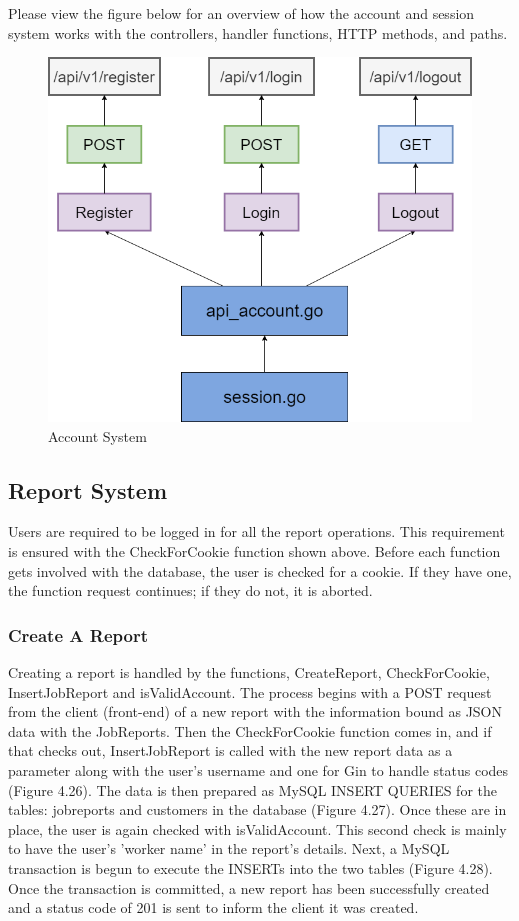 Please view the figure below for an overview of how the account and session system works with the controllers, handler functions, HTTP methods, and paths.
\begin{figure}[H]
    \caption{Account System}
    \label{image:accountSystem}
    \centering
    \includegraphics[width=1.0\textwidth]{images/horton/account_system/account_system.png}
\end{figure}

\subsection{Report System}
Users are required to be logged in for all the report operations. This requirement is ensured with the CheckForCookie function shown above. Before each function gets involved with the database, the user is checked for a cookie. If they have one, the function request continues; if they do not, it is aborted.

\subsubsection{Create A Report}
Creating a report is handled by the functions, CreateReport, CheckForCookie, InsertJobReport
and isValidAccount. The process begins with a POST request from the client (front-end) of a new report with the information bound as JSON data with the JobReports. Then the CheckForCookie function comes in, and if that checks out, InsertJobReport is called with the new report data as a parameter along with the user's username and one for Gin to handle status codes (Figure 4.26). The data is then prepared as MySQL INSERT QUERIES for the tables: jobreports and customers in the database (Figure 4.27). Once these are in place, the user is again checked with isValidAccount. This second check is mainly to have the user's 'worker name' in the report's details. Next, a MySQL transaction is begun to execute the INSERTs into the two tables (Figure 4.28). Once the transaction is committed, a new report has been successfully created and a status code of 201 is sent to inform the client it was created. 

